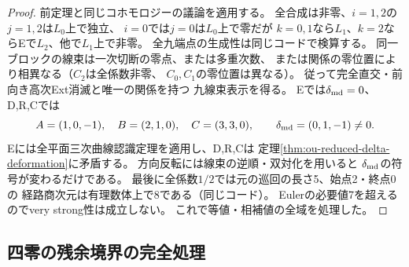 \begin{proof}
前定理と同じコホモロジーの議論を適用する。
全合成は非零、$i=1,2$の$j=1,2$は$L_0$上で独立、
$i=0$では$j=0$は$L_0$上で零だが
$k=0,1$なら$L_1$、$k=2$ならEで$L_2$、他で$L_1$上で非零。
全九端点の生成性は同じコードで検算する。
同一ブロックの線束は一次切断の零点、または多重次数、
または関係の零位置により相異なる（$C_2$は全係数非零、
$C_0,C_1$の零位置は異なる）。
従って完全直交・前向き高次Ext消滅と唯一の関係を持つ
九線束表示を得る。
Eでは$\delta_{\rm md}=0$、D,R,Cでは
\[
 A=(1,0,-1),\quad B=(2,1,0),\quad C=(3,3,0),\qquad
 \delta_{\rm md}=(0,1,-1)\ne0.
\]
Eには全平面三次曲線認識定理を適用し、D,R,Cは
定理\ref{thm:ou-reduced-delta-deformation}に矛盾する。
方向反転には線束の逆順・双対化を用いると
$\delta_{\rm md}$の符号が変わるだけである。
最後に全係数$1/2$では元の巡回の長さ5、始点2・終点0の
経路商次元は有理数体上で8である（同じコード）。
Eulerの必要値7を超えるのでvery strong性は成立しない。
これで等値・相補値の全域を処理した。
\end{proof}

\subsection{四零の残余境界の完全処理}

